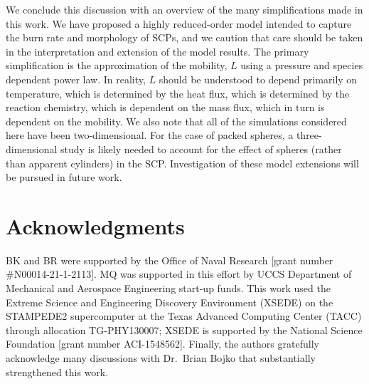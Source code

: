 \documentclass[colorinlistoftodos,review]{elsarticle}
\begin{document}
We conclude this discussion with an overview of the many simplifications made in this work.
We have proposed a highly reduced-order model intended to capture the burn rate and morphology of SCPs, and we caution that care should be taken in the interpretation and extension of the model results.
The primary simplification is the approximation of the mobility, $L$ using a pressure and species dependent power law.
In reality, $L$ should be understood to depend primarily on temperature, which is determined by the heat flux, which is determined by the reaction chemistry, which is dependent on the mass flux, which in turn is dependent on the mobility.
We also note that all of the simulations considered here have been two-dimensional.
For the case of packed spheres, a three-dimensional study is likely needed to account for the effect of spheres (rather than apparent cylinders) in the SCP.
Investigation of these model extensions will be pursued in future work.

\section*{Acknowledgments}
BK and BR were supported by the Office of Naval Research [grant number \#N00014-21-1-2113].
MQ was supported in this effort by UCCS Department of Mechanical and Aerospace Engineering start-up funds.
This work used the Extreme Science and Engineering Discovery Environment (XSEDE) on the STAMPEDE2 supercomputer at the Texas Advanced Computing Center (TACC) through allocation TG-PHY130007; XSEDE is supported by the National Science Foundation [grant number ACI-1548562].
Finally, the authors gratefully acknowledge many discussions with Dr.~Brian Bojko that substantially strengthened this work.







\appendix
\end{document}
